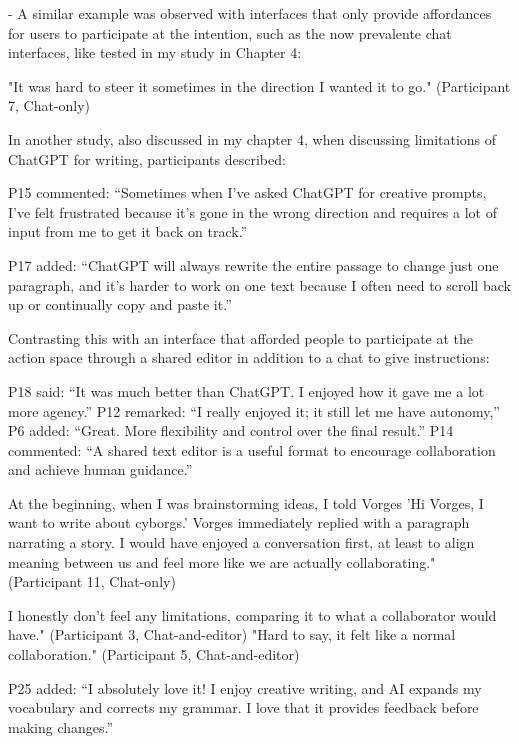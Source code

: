 - A similar example was observed with interfaces that only provide affordances for users to participate at the intention, such as the now prevalente chat interfaces, like tested in my study in Chapter 4: 

"It was hard to steer it sometimes in the direction I wanted it to go." (Participant 7, Chat-only)

In another study, also discussed in my chapter 4, when discussing limitations of ChatGPT for writing, participants described: 

P15 commented: “Sometimes when I’ve asked ChatGPT for creative prompts, I’ve felt frustrated because it’s gone in the
wrong direction and requires a lot of input from me to get it back on track.”

P17 added: “ChatGPT will always rewrite the entire passage to change just one paragraph, and it’s harder to work on
one text because I often need to scroll back up or continually copy and paste it.”

Contrasting this with an interface that afforded people to participate at the action space through a shared editor in addition to a chat to give instructions:

P18 said: “It was much better than ChatGPT. I enjoyed how it gave me a lot more agency.”
P12 remarked: “I really enjoyed it; it still let me have autonomy,”
P6 added: “Great. More flexibility and control over the final result.”
P14 commented: “A shared text editor is a useful format to encourage collaboration and achieve human guidance.”













At the beginning, when I was brainstorming ideas, I told Vorges ’Hi Vorges, I want to write about cyborgs.’
Vorges immediately replied with a paragraph narrating a story. I would have enjoyed a conversation first,
at least to align meaning between us and feel more like we are actually collaborating." (Participant 11, Chat-only)


I honestly don’t feel any limitations, comparing it to what a collaborator would have." (Participant 3,
Chat-and-editor)
"Hard to say, it felt like a normal collaboration." (Participant 5, Chat-and-editor)

P25 added: “I absolutely love it! I enjoy creative writing, and AI expands my vocabulary and corrects my grammar. I
love that it provides feedback before making changes.”



